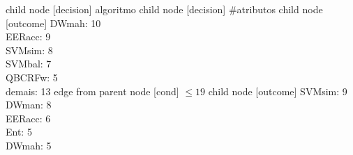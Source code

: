 child {node [decision] {algoritmo}
child {node [decision] {\#atributos}
child {node [outcome] {
DWmah: 10\\
EERacc: 9\\
SVMsim: 8\\
SVMbal: 7\\
QBCRFw: 5\\
demais: 13} edge from parent node [cond] {$\leq19$}}
child {node [outcome] {
SVMsim: 9\\
DWman: 8\\
EERacc: 6\\
Ent: 5\\
DWmah: 5\\
}}}}
